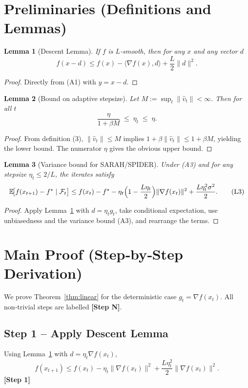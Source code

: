 \documentclass{article}
\newtheorem{lemma}{Lemma}
\newcommand{\EE}{\mathbb{E}}
\begin{document}
\newpage
\section*{Preliminaries (Definitions and Lemmas)}
\begin{lemma}[Descent Lemma]\label{lem:descent}
If $f$ is $L$‑smooth, then for any $x$ and any vector $d$
\[
f(x-d)\le f(x)-\langle\nabla f(x),d\rangle+\frac{L}{2}\|d\|^{2}.
\tag{L1}
\]
\end{lemma}
\begin{proof}
Directly from (A1) with $y=x-d$.
\end{proof}

\begin{lemma}[Bound on adaptive stepsize]\label{lem:stepsize}
Let $M:=\sup_{t}\|\hat v_{t}\|<\infty$. Then for all $t$
\[
\frac{\eta}{1+\beta M}\;\le\;\eta_{t}\;\le\;\eta .
\tag{L2}
\]
\end{lemma}
\begin{proof}
From definition (3), $\|\hat v_{t}\|\le M$ implies $1+\beta\|\hat v_{t}\|\le1+\beta M$, yielding the lower bound. The numerator $\eta$ gives the obvious upper bound.
\end{proof}

\begin{lemma}[Variance bound for SARAH/SPIDER]\label{lem:stoch}
Under (A3) and for any stepsize $\eta_{t}\le 2/L$, the iterates satisfy
\[
\EE\!\bigl[f(x_{t+1})-f^{\star}\mid\mathcal{F}_{t}\bigr]
\le f(x_{t})-f^{\star}
-\eta_{t}\Bigl(1-\frac{L\eta_{t}}{2}\Bigr)\|\nabla f(x_{t})\|^{2}
+\frac{L\eta_{t}^{2}\sigma^{2}}{2}.
\tag{L3}
\]
\end{lemma}
\begin{proof}
Apply Lemma~\ref{lem:descent} with $d=\eta_{t}g_{t}$, take conditional expectation, use unbiasedness and the variance bound (A3), and rearrange the terms.
\end{proof}

\section*{Main Proof (Step‑by‑Step Derivation)}
We prove Theorem~\ref{thm:linear} for the deterministic case $g_{t}=\nabla f(x_{t})$.  
All non‑trivial steps are labelled \textbf{[Step N]}.

\subsection*{Step 1 – Apply Descent Lemma}
Using Lemma~\ref{lem:descent} with $d=\eta_{t}\nabla f(x_{t})$,
\[
f(x_{t+1})\le f(x_{t})-\eta_{t}\|\nabla f(x_{t})\|^{2}
+\frac{L\eta_{t}^{2}}{2}\|\nabla f(x_{t})\|^{2}.
\tag{6}
\]
\textbf{[Step 1]}
\end{document}
